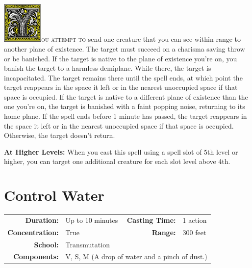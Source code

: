 \documentclass[12pt,showtrims]{memoir}
\begin{document}
\vspace{1\baselineskip}\noindent 
\lettrine[lines=4]{\includegraphics[height=58pt]{initials/Y.png}}{ou attempt to} send one creature that you can see within range to another plane of existence. The target must succeed on a charisma saving throw or be banished. If the target is native to the plane of existence you're on, you banish the target to a harmless demiplane. While there, the target is incapacitated. The target remains there until the spell ends, at which point the target reappears in the space it left or in the nearest unoccupied space if that space is occupied. If the target is native to a different plane of existence than the one you're on, the target is banished with a faint popping noise, returning to its home plane. If the spell ends before 1 minute has passed, the target reappears in the space it left or in the nearest unoccupied space if that space is occupied. Otherwise, the target doesn't return.

\vspace{8pt} \noindent\textbf{At Higher Levels:} When you cast this spell using a spell slot of 5th level or higher, you can target one additional creature for each slot level above 4th.
\newpage
\section*{Control Water}

{
\small\centering\vspace{-6pt}
\begin{tabular}{rlrl}
\toprule

\textbf{Duration:} & Up to 10 minutes &
\textbf{Casting Time:} & 1 action \\
\textbf{Concentration:} & True &
\textbf{Range:} & 300 feet \\
\textbf{School:} & Transmutation \\
\textbf{Components:} & \multicolumn{3}{p{0.7\textwidth}}{V, S, M (A drop of water and a pinch of dust.)}\\

\bottomrule
\end{tabular}
}
\end{document}
